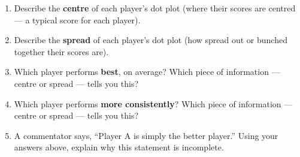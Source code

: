 \documentclass[11pt]{article}
\newcommand{\ans}{\hrulefill}
\newcommand{\anshere}{\par\vspace{0.8em}\noindent\ans\par\vspace{1.1em}}
\begin{document}
\begin{enumerate}[label=(\alph*)]
  \item Describe the \textbf{centre} of each player's dot plot (where their scores are centred ---
    a typical score for each player).
  \anshere
  \item Describe the \textbf{spread} of each player's dot plot (how spread out or bunched together
    their scores are).
  \anshere
  \item Which player performs \textbf{best}, on average? Which piece of information --- centre or
    spread --- tells you this?
  \anshere
  \item Which player performs \textbf{more consistently}? Which piece of information --- centre or
    spread --- tells you this?
  \anshere
  \item A commentator says, ``Player A is simply the better player.'' Using your answers above,
    explain why this statement is incomplete.
  \anshere
\end{enumerate}
\end{document}
